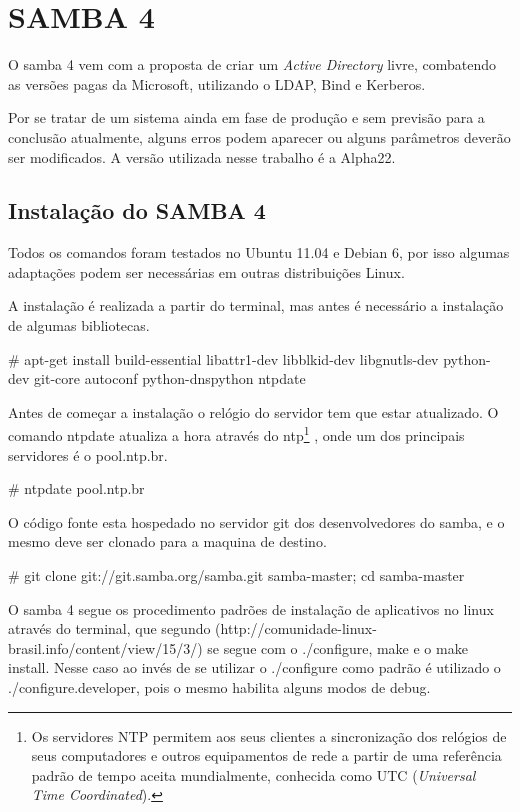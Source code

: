 \chapter{SAMBA 4}

O samba 4 vem com a proposta de criar um \textit{Active Directory} livre, combatendo as versões pagas da Microsoft, utilizando o LDAP, Bind e Kerberos.

Por se tratar de um sistema ainda em fase de produção e sem previsão para a conclusão atualmente, alguns erros podem aparecer ou alguns parâmetros deverão ser modificados. A versão utilizada nesse trabalho é a Alpha22.

\section{Instalação do SAMBA 4}

Todos os comandos foram testados no Ubuntu 11.04 e Debian 6, por isso algumas adaptações podem ser necessárias em outras distribuições Linux.

A instalação é realizada a partir do terminal, mas antes é necessário a instalação de algumas bibliotecas.

\# apt-get install build-essential libattr1-dev libblkid-dev libgnutls-dev python-dev git-core autoconf python-dnspython ntpdate

Antes de começar a instalação o relógio do servidor tem que estar atualizado. O comando ntpdate atualiza a hora através do  ntp\footnote[1]{Os servidores NTP permitem aos seus clientes a sincronização dos relógios de seus computadores e outros equipamentos de rede a partir de uma referência padrão de tempo aceita mundialmente, conhecida como UTC (\textit{Universal Time Coordinated}).\cite{RNP}} , onde um dos principais servidores é o pool.ntp.br.

\# ntpdate pool.ntp.br



O código fonte esta hospedado no servidor git dos desenvolvedores do samba, e o mesmo deve ser clonado para a maquina de destino.

\# git clone git://git.samba.org/samba.git samba-master; cd samba-master

O samba 4 segue os procedimento padrões de instalação de aplicativos no linux através do terminal, que segundo (http://comunidade-linux-brasil.info/content/view/15/3/) se segue com o ./configure, make e o make install.
Nesse caso ao invés de se utilizar o ./configure como padrão é utilizado o ./configure.developer, pois o mesmo habilita alguns modos de debug.

